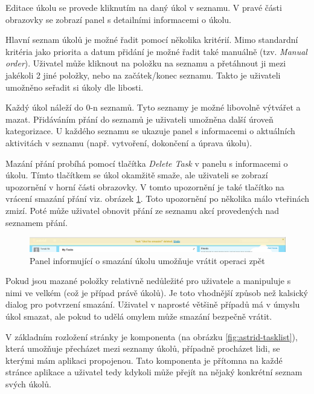 Editace úkolu se provede kliknutím na daný úkol v seznamu. V pravé části obrazovky se zobrazí panel s detailními informacemi o úkolu.

Hlavní seznam úkolů je možné řadit pomocí několika kritérií. Mimo standardní kritéria jako priorita a datum přidání je možné řadit také manuálně (tzv. \emph{Manual order}). Uživatel může kliknout na položku na seznamu a přetáhnout ji mezi jakékoli 2 jiné položky, nebo na začátek/konec seznamu. Takto je uživateli umožněno seřadit si úkoly dle libosti.

Každý úkol náleží do 0-n seznamů. Tyto seznamy je možné libovolně výtvářet a mazat. Přidáváním přání do seznamů je uživateli umožněna další úroveň kategorizace. U každého seznamu se ukazuje panel s informacemi o aktuálních aktivitách v seznamu (např. vytvoření, dokončení a úprava úkolu).

Mazání přání probíhá pomocí tlačítka \emph{Delete Task} v panelu s informacemi o úkolu. Tímto tlačítkem se úkol okamžitě smaže, ale uživateli se zobrazí upozornění v horní části obrazovky. V tomto upozornění je také tlačítko na vrácení smazání přání viz. obrázek \ref{fig:astrid-undo}. Toto upozornění po několika málo vteřinách zmizí. Poté může uživatel obnovit přání ze seznamu akcí provedených nad seznamem přání.

\begin{figure}[htb]
\begin{center}
\includegraphics[width=130mm]{./pictures/astrid-undo.png}
\caption{Panel informující o smazání úkolu umožňuje vrátit operaci zpět}
\label{fig:astrid-undo}
\end{center}
\end{figure}


Pokud jsou mazané položky relativně nedůležité pro uživatele a manipuluje s nimi ve velkém (což je případ právě úkolů). Je toto vhodnější způsob než kalsický dialog pro potvrzení smazání. Uživatel v naprosté většině případů má v úmyslu úkol smazat, ale pokud to udělá omylem může smazání bezpečně vrátit. 

V základním rozložení stránky je komponenta (na obrázku \ref{fig:astrid-tasklist}), která umožňuje přecházet mezi seznamy úkolů, případně procházet lidi, se kterými mám aplikaci propojenou. Tato komponenta je přítomna na každé stránce aplikace a uživatel tedy kdykoli může přejít na nějaký konkrétní seznam svých úkolů.

